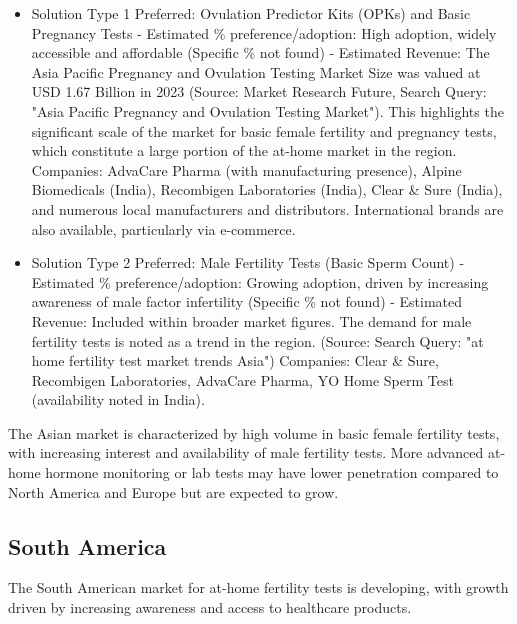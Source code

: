 \documentclass{article}
\begin{document}
\begin{itemize}
  \item Solution Type 1 Preferred: Ovulation Predictor Kits (OPKs) and Basic Pregnancy Tests - Estimated \% preference/adoption: High adoption, widely accessible and affordable (Specific \% not found) - Estimated Revenue: The Asia Pacific Pregnancy and Ovulation Testing Market Size was valued at USD 1.67 Billion in 2023 (Source: Market Research Future, Search Query: "Asia Pacific Pregnancy and Ovulation Testing Market"). This highlights the significant scale of the market for basic female fertility and pregnancy tests, which constitute a large portion of the at-home market in the region.
    Companies: AdvaCare Pharma (with manufacturing presence), Alpine Biomedicals (India), Recombigen Laboratories (India), Clear & Sure (India), and numerous local manufacturers and distributors. International brands are also available, particularly via e-commerce.
  \item Solution Type 2 Preferred: Male Fertility Tests (Basic Sperm Count) - Estimated \% preference/adoption: Growing adoption, driven by increasing awareness of male factor infertility (Specific \% not found) - Estimated Revenue: Included within broader market figures. The demand for male fertility tests is noted as a trend in the region. (Source: Search Query: "at home fertility test market trends Asia")
    Companies: Clear & Sure, Recombigen Laboratories, AdvaCare Pharma, YO Home Sperm Test (availability noted in India).
\end{itemize}
The Asian market is characterized by high volume in basic female fertility tests, with increasing interest and availability of male fertility tests. More advanced at-home hormone monitoring or lab tests may have lower penetration compared to North America and Europe but are expected to grow.

\subsection{South America}
The South American market for at-home fertility tests is developing, with growth driven by increasing awareness and access to healthcare products.
\end{document}
